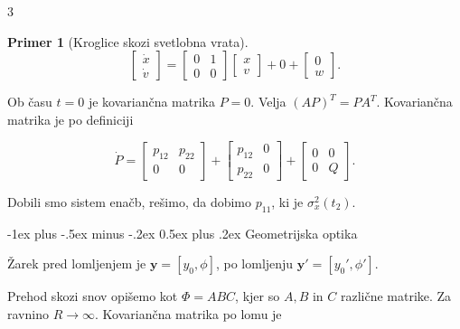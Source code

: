 \documentclass[10pt,landscape]{article}
\makeatletter
\renewcommand{\section}{\@startsection{section}{1}{0mm}%
	{-1ex plus -.5ex minus -.2ex}%
	{0.5ex plus .2ex}%
	{\normalfont\large\bfseries}}
\theoremstyle{definition}
\newtheorem*{primer}{Primer}
\makeatother
\begin{document}
\begin{multicols}{3}
\begin{primer}[Kroglice skozi svetlobna vrata]
\[ \begin{bmatrix} \dot{x} \\ \dot{v} \end{bmatrix} = \begin{bmatrix}
                                                      0 & 1 \\
                                                      0 & 0
                                                       \end{bmatrix} \begin{bmatrix} x \\ v \end{bmatrix} + 0 + \begin{bmatrix} 0 \\ w \end{bmatrix}.
\]

Ob času \( t= 0 \) je kovariančna matrika \( P = 0 \). Velja \( \left( AP \right)^T = PA^T \). Kovariančna matrika je po definiciji

\[ \dot{P} = \begin{bmatrix}
             p_{12} & p_{22} \\
             0 & 0
              \end{bmatrix} + \begin{bmatrix}
                              p_{12} & 0 \\
                              p_{22} & 0
                               \end{bmatrix} + \begin{bmatrix}
                                               0 & 0 \\
                                               0 & Q
                                                \end{bmatrix}.
\]

Dobili smo sistem enačb, rešimo, da dobimo \( p_{11} \), ki je \( \sigma_x ^2 (t_2) \).
\end{primer}

\section{Geometrijska optika}

Žarek pred lomljenjem je \( \mathbf{y} = [y_0, \phi] \), po lomljenju \( \mathbf{y}' = [y_0 ', \phi'] \).

Prehod skozi snov opišemo kot \( \Phi = ABC \), kjer so \( A, B \) in \( C \) različne matrike. Za ravnino \( R \to \infty \). Kovariančna matrika po lomu je


\end{multicols}
\end{document}
